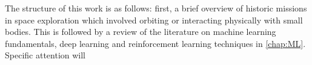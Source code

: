 The structure of this work is as follows: first, a brief overview of historic missions in space exploration which involved orbiting or interacting physically with small bodies. This is followed by a review of the literature on machine learning fundamentals, deep learning and reinforcement learning techniques in \autoref{chap:ML}. Specific attention will 








\cite{Rivkin2021}







\cite{Marks2022}



%


